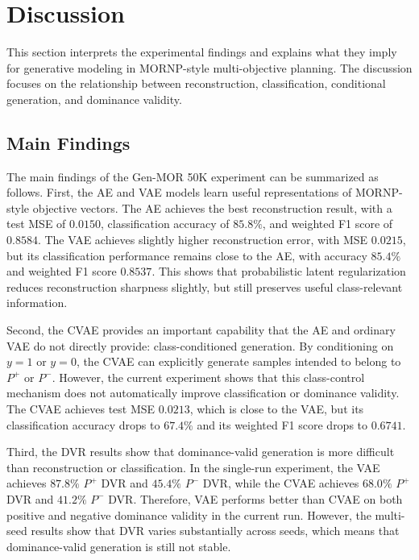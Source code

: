 \section{Discussion}
\label{sec:discussion}

This section interprets the experimental findings and explains what they imply for generative modeling in MORNP-style multi-objective planning. The discussion focuses on the relationship between reconstruction, classification, conditional generation, and dominance validity.

\subsection{Main Findings}
\label{subsec:discussion_main_findings}

The main findings of the Gen-MOR 50K experiment can be summarized as follows. First, the AE and VAE models learn useful representations of MORNP-style objective vectors. The AE achieves the best reconstruction result, with a test MSE of $0.0150$, classification accuracy of $85.8\%$, and weighted F1 score of $0.8584$. The VAE achieves slightly higher reconstruction error, with MSE $0.0215$, but its classification performance remains close to the AE, with accuracy $85.4\%$ and weighted F1 score $0.8537$. This shows that probabilistic latent regularization reduces reconstruction sharpness slightly, but still preserves useful class-relevant information.

Second, the CVAE provides an important capability that the AE and ordinary VAE do not directly provide: class-conditioned generation. By conditioning on $y=1$ or $y=0$, the CVAE can explicitly generate samples intended to belong to $P^{+}$ or $P^{-}$. However, the current experiment shows that this class-control mechanism does not automatically improve classification or dominance validity. The CVAE achieves test MSE $0.0213$, which is close to the VAE, but its classification accuracy drops to $67.4\%$ and its weighted F1 score drops to $0.6741$.

Third, the DVR results show that dominance-valid generation is more difficult than reconstruction or classification. In the single-run experiment, the VAE achieves $87.8\%$ $P^{+}$ DVR and $45.4\%$ $P^{-}$ DVR, while the CVAE achieves $68.0\%$ $P^{+}$ DVR and $41.2\%$ $P^{-}$ DVR. Therefore, VAE performs better than CVAE on both positive and negative dominance validity in the current run. However, the multi-seed results show that DVR varies substantially across seeds, which means that dominance-valid generation is still not stable.

